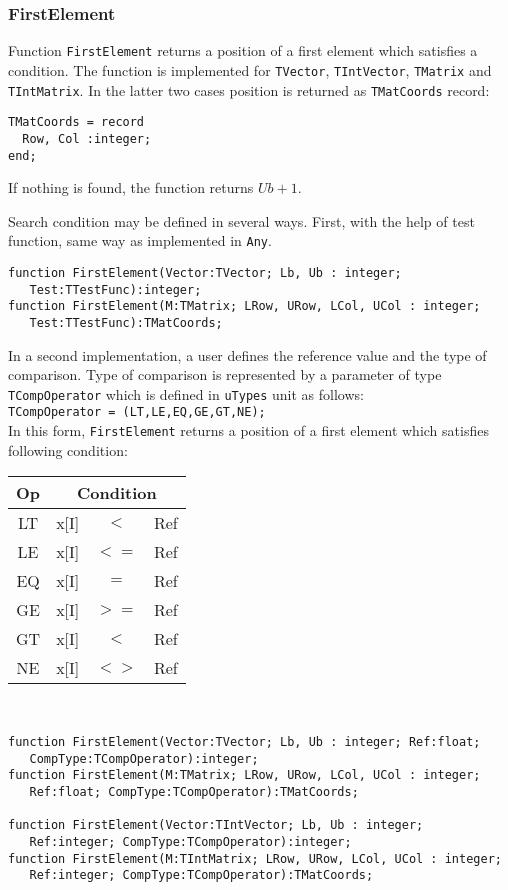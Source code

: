 \documentclass[12pt,a4paper,oneside]{article}
\newcommand{\code}[1]{\texttt{#1}}
\begin{document}
\subsubsection{FirstElement}
Function \code{FirstElement} returns a position of a first element which satisfies a condition. The function is implemented for \code{TVector}, \code{TIntVector}, \code{TMatrix} and \code{TIntMatrix}. In the latter two cases position is returned as \code{TMatCoords} record:
\begin{verbatim}
TMatCoords = record
  Row, Col :integer;
end;
\end{verbatim}
If nothing is found, the function returns $Ub+1$.

Search condition may be defined in several ways. First, with the help of test function, same way as implemented in \code{Any}. 
\begin{verbatim}
function FirstElement(Vector:TVector; Lb, Ub : integer; 
   Test:TTestFunc):integer;
function FirstElement(M:TMatrix; LRow, URow, LCol, UCol : integer;
   Test:TTestFunc):TMatCoords;
\end{verbatim}
In a second implementation, a user defines the reference value and the type of comparison. Type of comparison is represented by a parameter of type \code{TCompOperator} which is defined in \code{uTypes} unit as follows:\\
\code{TCompOperator = (LT,LE,EQ,GE,GT,NE);}\\
In this form, \code{FirstElement} returns a position of a first element which satisfies following condition:
\vskip 6pt
\begin{tabular}{c|rcl|}
	Op & \multicolumn{3}{|c|}{Condition}\\
	\hline
	LT & x[I]&$<$&Ref\\ 
	LE & x[I]&$<=$&Ref\\ 
	EQ & x[I]&$=$&Ref\\ 
	GE & x[I]&$>=$&Ref\\ 
	GT & x[I]&$<$&Ref\\ 
	NE & x[I]&$<>$&Ref \\ 
\end{tabular}\\ 
\vskip 6pt
\begin{verbatim}
function FirstElement(Vector:TVector; Lb, Ub : integer; Ref:float;
   CompType:TCompOperator):integer;
function FirstElement(M:TMatrix; LRow, URow, LCol, UCol : integer;
   Ref:float; CompType:TCompOperator):TMatCoords; 

function FirstElement(Vector:TIntVector; Lb, Ub : integer; 
   Ref:integer; CompType:TCompOperator):integer;
function FirstElement(M:TIntMatrix; LRow, URow, LCol, UCol : integer;
   Ref:integer; CompType:TCompOperator):TMatCoords;
\end{verbatim}
\end{document}
